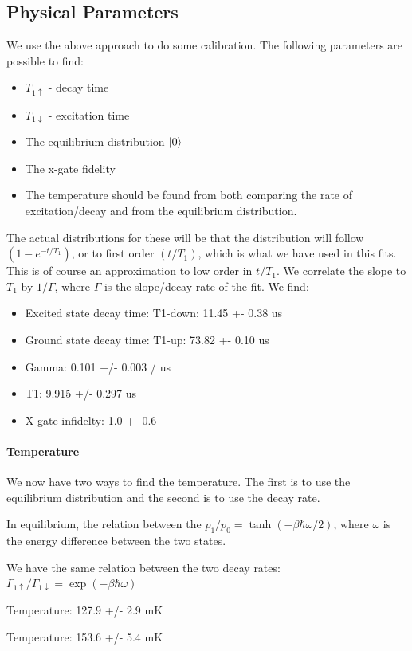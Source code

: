 \subsection{Physical Parameters}
We use the above approach to do some calibration. The following parameters are possible to find:
\begin{itemize}
\item $T_{1\uparrow}$ - decay time
\item $T_{1\downarrow}$ - excitation time 
\item The equilibrium distribution $\ket{0}$
\item The x-gate fidelity 
\item The temperature should be found from both comparing the rate of excitation/decay and from the equilibrium distribution.
\end{itemize}

The actual distributions for these will be that the distribution will follow $(1 - e^{-t/T_1})$, or to first order $(t/T_1)$, which is what we have used in this fits. This is of course an approximation to low order in $t/T_1$. We correlate the slope to $T_1$ by $1 / \Gamma$, where $\Gamma$ is the slope/decay rate of the fit.
We find:
\begin{itemize}
    \item Excited state decay time: T1-down: 11.45 +- 0.38 us
    \item Ground  state decay time: T1-up: 73.82 +- 0.10 us
    \item Gamma: 	 0.101 +/- 0.003 / us
    \item T1: 	 9.915 +/- 0.297 us
    \item X gate infidelty: 	 1.0 +- 0.6 %
\end{itemize}

\paragraph{Temperature}
We now have two ways to find the temperature. The first is to use the equilibrium distribution and the second is to use the decay rate.

In equilibrium, the relation between the $p_1/p_0 = \tanh(-\beta \hbar \omega / 2)$, where $\omega$ is the energy difference between the two states.

We have the same relation between the two decay rates: $\Gamma_{1\uparrow} / \Gamma_{1\downarrow} = \exp(-\beta \hbar \omega)$

Temperature: 	 127.9 +/- 2.9 mK

Temperature: 	 153.6 +/- 5.4 mK
